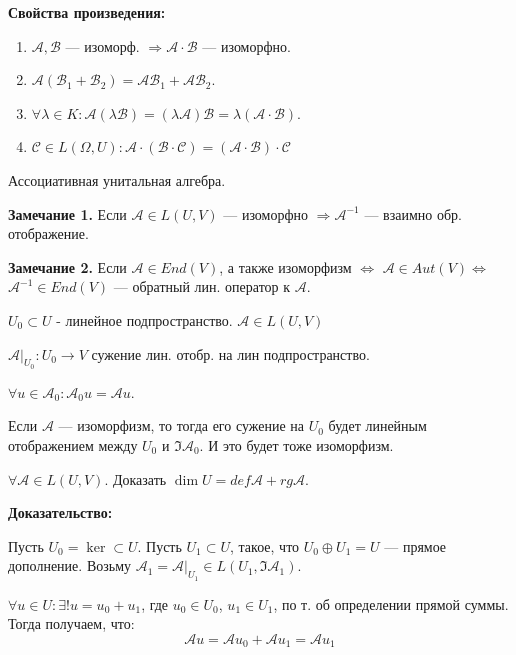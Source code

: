 \textbf{Свойства произведения:}
\begin{enumerate}
    \item $\mathcal{A}, \mathcal{B}$ --- изоморф. $\Rightarrow \mathcal{A} \cdot \mathcal{B}$ --- изоморфно.
    \item $\mathcal{A}(\mathcal{B}_1 + \mathcal{B}_2) =  \mathcal{A} \mathcal{B}_1 + \mathcal{A} \mathcal{B}_2$.
    \item  $\forall \lambda \in K: \mathcal{A}(\lambda \mathcal{B}) = (\lambda \mathcal{A}) \mathcal{B} = \lambda (\mathcal{A} \cdot \mathcal{B})$.
    \item $\mathcal{C} \in L(\Omega, U): \mathcal{A} \cdot (\mathcal{B}\cdot \mathcal{C}) = (\mathcal{A}\cdot \mathcal{B}) \cdot \mathcal{C}$
\end{enumerate}

Ассоциативная унитальная алгебра.

    \textbf{Замечание 1.} Если $\mathcal{A} \in L(U,V)$ --- изоморфно $\Rightarrow \mathcal{A}^{-1}$ --- взаимно обр. отображение.

\textbf{Замечание 2.} Если $\mathcal{A} \in End(V)$, а также изоморфизм $\Leftrightarrow$ $\mathcal{A} \in Aut(V) \Leftrightarrow$ $\mathcal{A}^{-1}\in End(V)$ --- обратный лин. оператор к $\mathcal{A}$.  

 $U_0 \subset U$ - линейное подпространство. $\mathcal{A} \in L(U,V)$

$\mathcal{A}|_{U_0}: U_0 \rightarrow V$ сужение лин. отобр. на лин подпространство.

$\forall u \in \mathcal{A}_0:\mathcal{A}_0 u = \mathcal{A}u$.

Если $\mathcal{A}$ --- изоморфизм, то тогда его сужение на $U_0$ будет линейным отображением между $U_0$ и $\Im \mathcal{A}_0$. И это будет тоже изоморфизм.



$\forall \mathcal{A} \in L(U, V)$. Доказать $\dim U = def \mathcal{A} + rg \mathcal{A}$.


\textbf{Доказательство:}


Пусть $ U_0 = \ker \subset U$.  Пусть $ U_1 \subset U$, такое, что $U_0 \oplus U_1 = U$ --- прямое дополнение. Возьму $\mathcal{A}_1 = \mathcal{A}|_{U_1} \in L(U_1, \Im \mathcal{A}_1)$.

$\forall u \in U: \exists! u = u_0 + u_1$, где $u_0 \in U_0$, $u_1 \in U_1$, по т. об определении прямой суммы. Тогда получаем, что:
$$\mathcal{A}u = \mathcal{A}u_0 +\mathcal{A}u_1 = \mathcal{A}u_1$$

